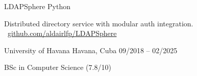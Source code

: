 \documentclass[]{awesome-cv}
\begin{document}
\begin{cventries}
	\vspace{-3mm}
	\cventry
	{}
	{LDAPSphere \vspace{-5mm}}
	{Python \vspace{-5mm}}
	{}
	{\begin{cvsectionnormaltext}
			\item{Distributed directory service with modular auth integration. \faLink\ \href{https://github.com/aldairlfp/LDAPSphere}{github.com/aldairlfp/LDAPSphere}
      }
		\end{cvsectionnormaltext}}

	\vspace{-5mm}

\end{cventries}

\vspace{8mm}
\begin{cventries}
	\vspace{-3mm}
	\cventry
	{}
	{University of Havana \vspace{-5mm}}
	{Havana, Cuba \vspace{-5mm}}
	{09/2018 – 02/2025 \vspace{-5mm}}
	{\begin{cvsectionnormaltext}
			\item{BSc in Computer Science (7.8/10)}
		\end{cvsectionnormaltext}}
\end{cventries}
\end{document}
